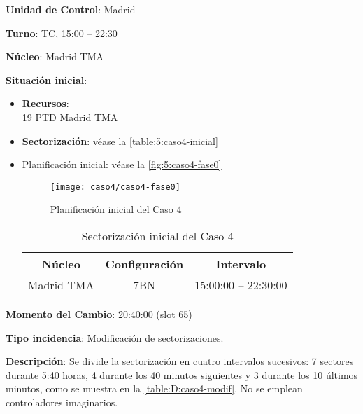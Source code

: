 \textbf{Unidad de Control}: Madrid

\textbf{Turno}: TC, 15:00 -- 22:30

\textbf{Núcleo}: Madrid TMA

\textbf{Situación inicial}:
\begin{itemize}[label={}]
	
	\item \textbf{Recursos}: \\
	19 PTD Madrid TMA
	
	
	\item \textbf{Sectorización}: véase la \autoref{table:5:caso4-inicial}
	
	\item Planificación inicial: véase la \autoref{fig:5:caso4-fase0}
	
	\begin{figure}[!h]
		\centering
		\texttt{[image: caso4/caso4-fase0]}
		\caption{Planificación inicial del Caso 4}
		\label{fig:5:caso4-fase0}
	\end{figure}

	\begin{table}[h]
		\centering
		\caption{Sectorización inicial del Caso 4}
		\label{table:5:caso4-inicial}
		\begin{tabular}{ccc}
			\hline
			\textbf{Núcleo} & \textbf{Configuración} & \textbf{Intervalo} \\ \hline
			Madrid TMA             & 7BN                                      & 15:00:00 -- 22:30:00                \\ \hline
		\end{tabular}
	\end{table}
\end{itemize}

\textbf{Momento del Cambio}: 20:40:00  (slot 65)

\textbf{Tipo incidencia}: Modificación de sectorizaciones.

\textbf{Descripción}: Se divide la sectorización en cuatro intervalos sucesivos: 7 sectores durante 5:40 horas, 4 durante los 40 minutos siguientes y 3 durante los 10 últimos minutos, como se muestra en la \autoref{table:D:caso4-modif}. No se emplean controladores imaginarios.

